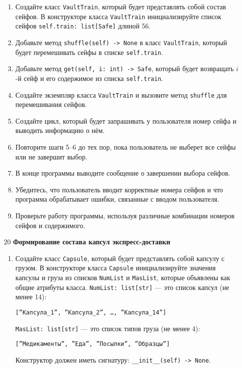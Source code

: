 \begin{enumerate}
\begin{enumerate}
    \item Создайте класс \texttt{VaultTrain}, который будет представлять собой состав сейфов. В конструкторе класса \texttt{VaultTrain} инициализируйте список сейфов \texttt{self.train: list[Safe]} длиной 56.

    \item Добавьте метод \texttt{shuffle(self) -> None} в класс \texttt{VaultTrain}, который будет перемешивать сейфы в списке \texttt{self.train}.

    \item Добавьте метод \texttt{get(self, i: int) -> Safe}, который будет возвращать $i$-й сейф и его содержимое из списка \texttt{self.train}.

    \item Создайте экземпляр класса \texttt{VaultTrain} и вызовите метод \texttt{shuffle} для перемешивания сейфов.

    \item Создайте цикл, который будет запрашивать у пользователя номер сейфа и выводить информацию о нём.

    \item Повторите шаги 5–6 до тех пор, пока пользователь не выберет все сейфы или не завершит выбор.

    \item В конце программы выводите сообщение о завершении выбора сейфов.

    \item Убедитесь, что пользователь вводит корректные номера сейфов и что программа обрабатывает ошибки, связанные с вводом пользователя.

    \item Проверьте работу программы, используя различные комбинации номеров сейфов и содержимого.
\end{enumerate}

\item[20] \textbf{Формирование состава капсул экспресс-доставки}
\begin{enumerate}
    \item Создайте класс \texttt{Capsule}, который будет представлять собой капсулу с грузом. В конструкторе класса \texttt{Capsule} инициализируйте значения капсулы и груза из списков \texttt{NumList} и \texttt{MasList}, которые объявлены как общие атрибуты класса. \texttt{NumList: list[str]} — это список капсул (не менее 14): 
    \begin{center}
        \texttt{[''Капсула\_1'', ''Капсула\_2'', \dots, ''Капсула\_14'']}
    \end{center}
    \texttt{MasList: list[str]} — это список типов груза (не менее 4):
    \begin{center}
        \texttt{[''Медикаменты'', ''Еда'', ''Посылки'', ''Образцы'']}
    \end{center}
    Конструктор должен иметь сигнатуру: \texttt{\_\_init\_\_(self) -> None}.


\end{enumerate}
\end{enumerate}
